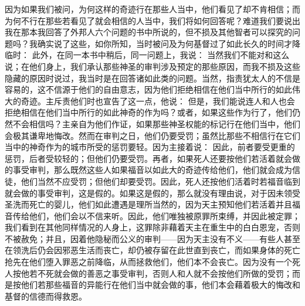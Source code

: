 因为如果我们被问，为何这样的奇迹行在那些人当中，他们看见了却不肯相信；而为何不行在那些若看见了就会相信的人当中，我们将如何回答呢？难道我们要说出我在那本我回答了外邦人六个问题的书中所说的，但不损及其他智者可以探究的问题吗？我确实说了这些，如你所知，当时被问及为何基督过了如此长久的时间才降临时： 此外，在同一本书中稍后，同一问题上，我说： 当然我们不能对和这么说；在他们身上，我们承认那些神圣的审判涉及预定的那些原因，而我不损及这些隐藏的原因时说过，我当时是在回答诸如此类的问题。当然，指责犹太人的不信是容易的，这不信源于他们的自由意志，因为他们拒绝相信在他们当中所行的如此伟大的奇迹。主斥责他们时也宣告了这一点，他说：  但是，我们能说连人和人也会拒绝相信在他们当中所行的如此神奇的作为吗？或者，如果这些作为行了，他们仍然不会相信吗？主亲自为他们作证，如果那些神圣权能的标记行在他们当中，他们会极其谦卑地悔改。然而在审判之日，他们仍要受罚；虽然比那些不相信行在它们当中的神奇作为的城市所受的惩罚要轻。因为主接着说：  因此，前者要受更重的惩罚，后者受较轻的；但他们仍要受罚。再者，如果死人还要按他们若活着就会做的事受审判，那么既然这些人如果福音以如此大的奇迹传给他们，他们就会成为信徒，他们当然不应受罚；但他们却要受罚。因此，死人还按他们活着时若福音临到就会做的事受审判，这是假的。如果这是假的，那么就没有理由说，对于因未领受圣洗而死亡的婴儿，他们如此遭遇是理所当然的，因为天主预知他们若活着并且福音传给他们，他们会以不信来听。因此，他们唯独被原罪所束缚，并因此被定罪；我们看到在其他同样情况的人身上，这罪除非藉着天主在重生中的白白恩宠，否则不被赦免；并且，因着他隐秘而公义的审判——因为天主没有不义——有些人甚至在领洗后仍会因邪恶生活而丧亡，却仍被存留在此世直到丧亡，而如果身体的死亡抢先在他们堕入罪恶之前降临，从而拯救他们，他们本不会丧亡。因为没有一个死人按他若不死就会做的善恶之事受审判，否则人和人就不会按他们所做的受罚；而是按他们若那些福音的异能行在他们当中就会做的事，他们本会藉着极大的悔改和基督的信德而得救恩。\par


